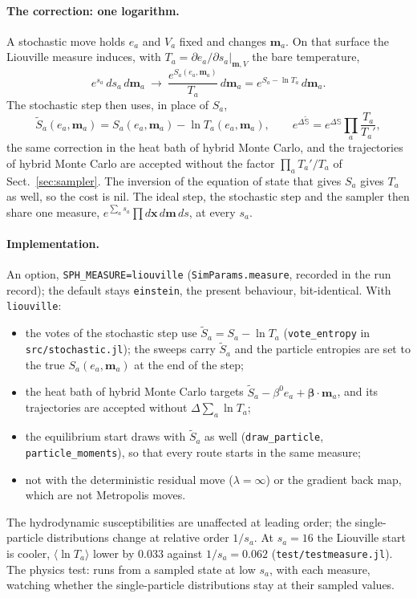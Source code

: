 \documentclass[11pt,aps,preprint,nofootinbib,superscriptaddress,tightenlines]{revtex4-2}
\def\st{\begin{equation}}
\def\stp{\end{equation}}
\def\Sect#1{Sect.~\ref{#1}}
\newcommand{\avg}[1]{\langle #1\rangle}
\let\oldparagraph\paragraph
\renewcommand{\paragraph}{\par\bigskip\oldparagraph}
\begin{document}
\paragraph{The correction: one logarithm.}  A stochastic move holds $e_a$ and $V_a$ fixed and changes $\bm m_a$.  On that surface the
Liouville measure induces, with $T_a=\partial e_a/\partial s_a|_{\bm m,V}$ the bare temperature,
\st
e^{s_a}\,ds_a\,d\bm m_a\ \to\ \frac{e^{S_a(e_a,\bm m_a)}}{T_a}\,d\bm m_a=e^{S_a-\ln T_a}\,d\bm m_a .
\stp
The stochastic step then uses, in place of $S_a$,
\st
\tilde S_a(e_a,\bm m_a)=S_a(e_a,\bm m_a)-\ln T_a(e_a,\bm m_a),\qquad
e^{\Delta\tilde{\mathbb S}}=e^{\Delta\mathbb S}\prod_a\frac{T_a}{T_a'} ,
\stp
the same correction in the heat bath of hybrid Monte Carlo, and the trajectories of hybrid Monte Carlo are accepted without
the factor $\prod_aT_a'/T_a$ of \Sect{sec:sampler}.  The inversion of the equation of state that gives $S_a$ gives $T_a$ as well, so the
cost is nil.  The ideal step, the stochastic step and the sampler then share one measure, $e^{\sum_as_a}\prod d\bm x\,d\bm m\,ds$, at every $s_a$.

\paragraph{Implementation.}  An option, \texttt{SPH\_MEASURE=liouville} (\texttt{SimParams.measure}, recorded in the run record); the
default stays \texttt{einstein}, the present behaviour, bit-identical.  With \texttt{liouville}:
\begin{itemize}
\item the votes of the stochastic step use $\tilde S_a=S_a-\ln T_a$ (\texttt{vote\_entropy} in \texttt{src/stochastic.jl}); the sweeps carry $\tilde S_a$ and
  the particle entropies are set to the true $S_a(e_a,\bm m_a)$ at the end of the step;
\item the heat bath of hybrid Monte Carlo targets $\tilde S_a-\beta^0e_a+\bm\beta\cdot\bm m_a$, and its trajectories are accepted without $\Delta\sum_a\ln T_a$;
\item the equilibrium start draws with $\tilde S_a$ as well (\texttt{draw\_particle}, \texttt{particle\_moments}), so that every route starts in the
  same measure;
\item not with the deterministic residual move ($\lambda=\infty$) or the gradient back map, which are not Metropolis moves.
\end{itemize}
The hydrodynamic susceptibilities are unaffected at leading order; the single-particle distributions change at relative order
$1/s_a$.  At $s_a=16$ the Liouville start is cooler, $\avg{\ln T_a}$ lower by $0.033$ against $1/s_a=0.062$ (\texttt{test/testmeasure.jl}).  The
physics test: runs from a sampled state at low $s_a$, with each measure, watching whether the single-particle distributions stay at
their sampled values.
\end{document}
